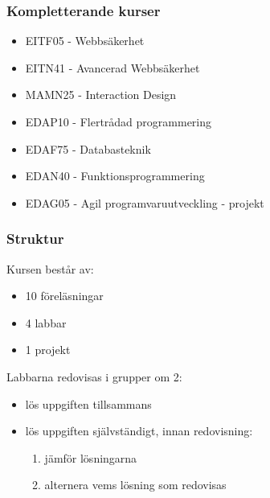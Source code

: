 \documentclass[aspectratio=1610]{beamer}
\begin{document}
\begin{frame}
  \frametitle{Kompletterande kurser}
\begin{itemize}
\item EITF05 - Webbsäkerhet
\item EITN41 - Avancerad Webbsäkerhet
\item MAMN25 - Interaction Design
\item EDAP10  - Flertrådad programmering
\item EDAF75 - Databasteknik
\item EDAN40 - Funktionsprogrammering
\item EDAG05 - Agil programvaruutveckling - projekt
\end{itemize}

\end{frame}

\begin{frame}
  \frametitle{Struktur}
Kursen består av:
\begin{itemize}
  \item 10 föreläsningar
  \item 4 labbar
  \item 1 projekt
\end{itemize}
\vspace{2mm}
Labbarna redovisas i grupper om 2:
\begin{itemize}
 \item lös uppgiften tillsammans
 \item lös uppgiften självständigt, innan redovisning:
   \begin{enumerate}
     \item jämför lösningarna
     \item alternera vems lösning som redovisas
   \end{enumerate}
\end{itemize}
\end{frame}
\end{document}
